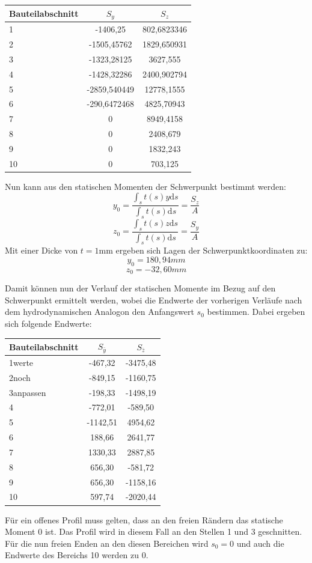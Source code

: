 \begin{center}
\begin{tabular}[h]{l|c|c}
	
Bauteilabschnitt&$S_{y}$&$S_{z}$\\
\hline
1& -1406,25&802,6823346\\
2&-1505,45762&1829,650931\\
3&-1323,28125&3627,555\\
4&-1428,32286&2400,902794\\
5&-2859,540449&12778,1555\\
6&-290,6472468&4825,70943\\
7&0&8949,4158\\
8&0&2408,679\\
9&0&1832,243\\
10&0&703,125\\
\end{tabular}
\end{center}

\noindent Nun kann aus den statischen Momenten der Schwerpunkt bestimmt werden:
\begin{equation}
	y_{0}=\frac{\int_{s}{}t(s)y\mathrm{d}s}{\int_{s}{}t(s)\mathrm{d}s}=\frac{S_{z}}{A}
\end{equation}
\begin{equation}
	z_{0}=\frac{\int_{s}{}t(s)z\mathrm{d}s}{\int_{s}{}t(s)\mathrm{d}s}=\frac{S_{y}}{A}
\end{equation}
Mit einer Dicke von $t=1\mathrm{mm}$ ergeben sich Lagen der Schwerpunktkoordinaten zu:
\begin{equation}
	y_{0}=180,94mm
\end{equation}
\begin{equation}
	z_{0}=-32,60mm
\end{equation}

Damit können nun der Verlauf der statischen Momente im Bezug auf den Schwerpunkt ermittelt werden, wobei die Endwerte der vorherigen Verläufe nach dem hydrodynamischen Analogon den Anfangswert $s_0$ bestimmen. Dabei ergeben sich folgende Endwerte:
\begin{center}
\begin{tabular}[h]{l|c|c}
Bauteilabschnitt&$S_{\bar{y}}$&$S_{\bar{z}}$\\
\hline
1werte&-467,32&-3475,48\\
2noch&-849,15&-1160,75\\
3anpassen&-198,33&-1498,19\\
4&-772,01&-589,50\\
5&-1142,51&4954,62\\
6&188,66&2641,77\\
7&1330,33&2887,85\\
8&656,30&-581,72\\
9&656,30&-1158,16\\
10&597,74&-2020,44\\
\end{tabular}
\end{center}
Für ein offenes Profil muss gelten, dass an den freien Rändern das statische Moment $ 0 $ ist. Das Profil wird in diesem Fall an den Stellen 1 und 3 geschnitten. Für die nun freien Enden an den diesen Bereichen wird $s_0=0$ und auch die Endwerte des Bereichs 10 werden zu $0$.

